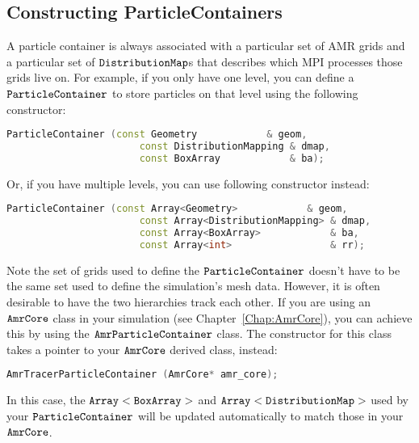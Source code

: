 \subsection{Constructing ParticleContainers}

A particle container is always associated with a particular set of AMR grids and a particular set of $\tt{DistributionMap}$s that describes which MPI processes those grids live on.
For example, if you only have one level, you can define a $\tt{ParticleContainer}$ to store particles on that level using the following constructor:

\begin{lstlisting}[language=cpp]
    ParticleContainer (const Geometry            & geom,
                       const DistributionMapping & dmap,
                       const BoxArray            & ba);
\end{lstlisting}

Or, if you have multiple levels, you can use following constructor instead:

\begin{lstlisting}[language=cpp]
    ParticleContainer (const Array<Geometry>            & geom,
                       const Array<DistributionMapping> & dmap,
                       const Array<BoxArray>            & ba,
                       const Array<int>                 & rr);
\end{lstlisting}

Note the set of grids used to define the $\tt{ParticleContainer}$ doesn't have to be the same set used to define the simulation's mesh data. However, it is often desirable to have
the two hierarchies track each other. If you are using an $\tt{AmrCore}$ class in your simulation (see Chapter~\ref{Chap:AmrCore}), you can achieve this by using 
the $\tt{AmrParticleContainer}$ class. The constructor for this class takes a pointer to your $\tt{AmrCore}$ derived class, instead:

\begin{lstlisting}[language=cpp]
  AmrTracerParticleContainer (AmrCore* amr_core);
\end{lstlisting}

In this case, the $\tt{Array<BoxArray>}$ and $\tt{Array<DistributionMap>}$ used by your $\tt{ParticleContainer}$ will be updated automatically to match those in
your $\tt{AmrCore}$. 


